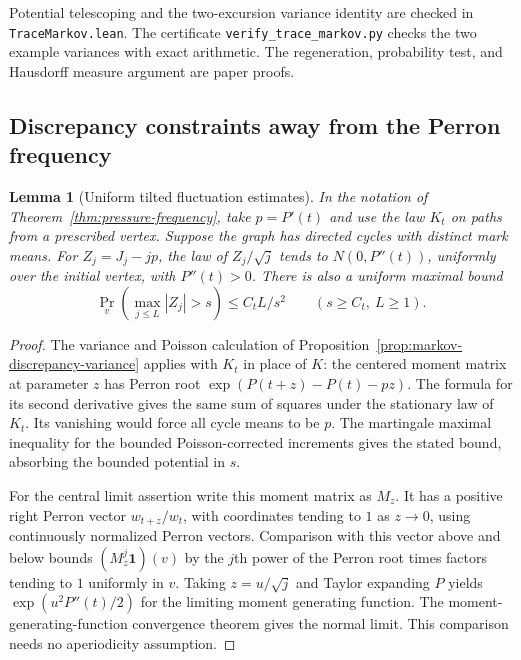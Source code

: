 \documentclass[11pt]{article}
\newtheorem{lemma}[theorem]{Lemma}
\theoremstyle{definition}
\theoremstyle{remark}
\begin{document}
Potential telescoping and the two-excursion variance identity
are checked in \texttt{TraceMarkov.lean}. The certificate
\texttt{verify\_trace\_markov.py} checks the two example variances
with exact arithmetic. The regeneration, probability test, and
Hausdorff measure argument are paper proofs.


\subsection{Discrepancy constraints away from the Perron frequency}

\begin{lemma}[Uniform tilted fluctuation estimates]
\label{lem:tilted-clt}
In the notation of Theorem~\ref{thm:pressure-frequency},
take $p=P'(t)$ and use the law $K_t$ on paths from a prescribed
vertex. Suppose the graph has directed cycles with distinct
mark means. For $Z_j=J_j-jp$, the law of $Z_j/\sqrt j$ tends
to $N(0,P''(t))$, uniformly over the initial vertex, with
$P''(t)>0$. There is also a uniform maximal bound
\[
 \Pr_v\!\left(\max_{j\le L}|Z_j|>s\right)\le C_t L/s^2
 \qquad(s\ge C_t,\ L\ge1).
\]
\end{lemma}
\begin{proof}
The variance and Poisson calculation of
Proposition~\ref{prop:markov-discrepancy-variance} applies with
$K_t$ in place of $K$: the centered moment matrix at parameter $z$
has Perron root $\exp(P(t+z)-P(t)-pz)$.
The formula for its second derivative gives the same sum of squares
under the stationary law of $K_t$. Its vanishing would force all
cycle means to be $p$. The martingale maximal inequality for
the bounded Poisson-corrected increments gives the stated bound,
absorbing the bounded potential in $s$.

For the central limit assertion write this moment matrix as $M_z$.
It has a positive right Perron vector $w_{t+z}/w_t$, with
coordinates tending to $1$ as $z\to0$, using continuously
normalized Perron vectors. Comparison with this vector above
and below bounds $(M_z^j\mathbf 1)(v)$ by the $j$th power of the
Perron root times factors tending to $1$ uniformly in $v$.
Taking $z=u/\sqrt j$ and Taylor expanding $P$ yields
$\exp(u^2P''(t)/2)$ for the limiting moment generating function.
The moment-generating-function convergence theorem
\cite{CurtissMGF} gives the normal limit. This comparison needs
no aperiodicity assumption.
\end{proof}
\end{document}
